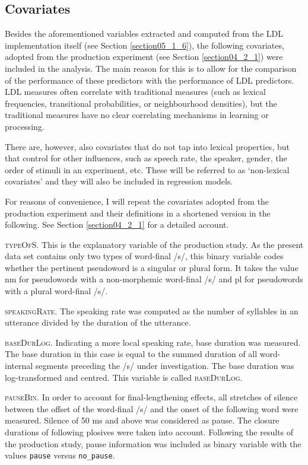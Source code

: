 \subsection{Covariates}\label{section05_2_1}

Besides the aforementioned variables extracted and computed from the LDL implementation itself (see Section \ref{section05_1_6}), the following covariates, adopted from the production experiment (see Section \ref{section04_2_1}) were included in the analysis. The main reason for this is to allow for the comparison of the performance of these predictors with the performance of LDL predictors. LDL measures often correlate with traditional measures (such as lexical frequencies, transitional probabilities, or neighbourhood densities), but the traditional measures have no clear correlating mechanisms in learning or processing.

There are, however, also covariates that do not tap into lexical properties, but that control for other influences, such as speech rate, the speaker, gender, the order of stimuli in an experiment, etc. These will be referred to as ‘non-lexical covariates’ and they will also be included in regression models. 

For reasons of convenience, I will repeat the covariates adopted from the production experiment and their definitions in a shortened version in the following. See Section \ref{section04_2_1} for a detailed account.

\textsc{typeOfS}. This is the explanatory variable of the production study. As the present data set contains only two types of word-final /s/, this binary variable codes whether the pertinent pseudoword is a singular or plural form. It takes the value nm for pseudowords with a non-morphemic word-final /s/ and pl for pseudowords with a plural word-final /s/.

\textsc{speakingRate}. The speaking rate was computed as the number of syllables in an utterance divided by the duration of the utterance.

\textsc{baseDurLog}. Indicating a more local speaking rate, base duration was measured. The base duration in this case is equal to the summed duration of all word-internal segments preceding the /s/ under investigation. The base duration was log-transformed and centred. This variable is called \textsc{baseDurLog}.

\textsc{pauseBin}. In order to account for final-lengthening effects, all stretches of silence between the offset of the word-final /s/ and the onset of the following word were measured. Silence of 50 ms and above was considered as pause. The closure durations of following plosives were taken into account. Following the results of the production study, pause information was included as binary variable with the values \texttt{pause} versus \texttt{no\_pause}.

